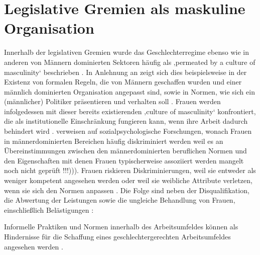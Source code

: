 \documentclass[12pt, 
    twoside=false, 
    bibliography=totoc, 
    numbers=endperiod, 
    headings=normal, 
    toc=chapterentrydotfill
    ]{scrbook}
\begin{document}
\section{Legislative Gremien als maskuline Organisation }

Innerhalb der legislativen Gremien wurde das Geschlechterregime ebenso wie in anderen von Männern dominierten Sektoren häufig als ‚permeated by a culture of masculinity‘ beschrieben \parencites[200]{erikson_2018}{lovenduski_2005}. In Anlehnung an \textcite{acker_1990} zeigt sich dies beispielsweise in der Existenz von formalen Regeln, die von Männern geschaffen wurden und einer männlich dominierten Organisation angepasst sind, sowie in Normen, wie sich ein (männlicher) Politiker präsentieren und verhalten soll \parencites[200]{erikson_2018}[48]{acker_1990}. Frauen werden infolgedessen mit dieser bereits existierenden ‚culture of masculinity‘ konfrontiert, die als institutionelle Einschränkung fungieren kann, wenn ihre Arbeit dadurch behindert wird \parencites[200]{erikson_2018}[47-56]{lovenduski_2005}. \textcite{erikson_2018} verweisen auf sozialpsychologische Forschungen, wonach Frauen in männerdominierten Bereichen häufig diskriminiert werden weil es an Übereinstimmungen zwischen den männerdominierten beruflichen Normen und den Eigenschaften mit denen Frauen typischerweise assoziiert werden mangelt \parencites[vgl.][]{burgess_1999}{eagly_2002}{heilman_2001}{heilman_2004} noch nicht geprüft !!!))). Frauen riskieren Diskriminierungen, weil sie entweder als weniger kompetent angesehen werden oder weil sie weibliche Attribute verletzen, wenn sie sich den Normen anpassen \parencite[200]{erikson_2018}. Die Folge sind neben der Disqualifikation, die Abwertung der Leistungen sowie die ungleiche Behandlung von Frauen, einschließlich Belästigungen \parencites[200]{erikson_2018}{heilman_2001}{burgess_1999}:

\begin{quote}
     \parencite[200]{erikson_2018}
\end{quote}

Informelle Praktiken und Normen innerhalb des Arbeitsumfeldes können als Hindernisse für die Schaffung eines geschlechtergerechten Arbeitsumfeldes angesehen werden \parencite[200]{erikson_2018}. 
\end{document}
